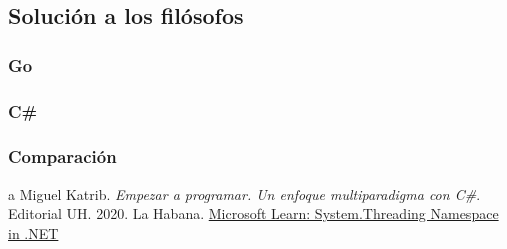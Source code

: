 \documentclass[10pt]{article} %
\begin{document}
\subsection{Solución a los filósofos}

\subsubsection{Go}

\subsubsection{C\#}

\subsubsection{Comparaci\'on}

\begin{thebibliography}
	a
	 Miguel Katrib. \emph{Empezar a programar. Un enfoque multiparadigma con C\#}. 
	Editorial UH.
	2020.
	La Habana.
	 \href{https://learn.microsoft.com/en-us/dotnet/api/system.threading?view=net-7.0}{Microsoft Learn: System.Threading Namespace in .NET}
\end{thebibliography}
\end{document}
